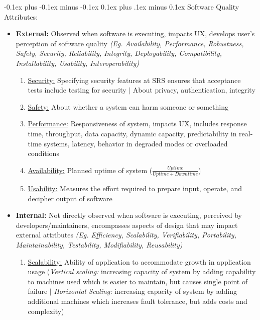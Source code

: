 \documentclass[landscape]{article}
\makeatletter
\renewcommand{\subsection}{\@startsection{subsection}{2}{0mm}%
  {-0.1ex plus -0.1ex minus -0.1ex}%
  {0.1ex plus .1ex minus 0.1ex}%
{\normalfont\scriptsize\bfseries}}
\makeatother
\begin{document}
\begin{multicols*}{5}
    \subsection{Software Quality Attributes:}
    \begin{itemize}
      \item \textbf{External:} Observed when software is executing, impacts UX, develops user's perception of software quality \textit{(Eg. Availability, Performance, Robustness, Safety, Security, Reliability, Integrity, Deployability, Compatibility, Installability, Usability, Interoperability)}
      \begin{enumerate}
        \item \underline{Security:} Specifying security features at SRS ensures that acceptance tests include testing for security $|$ About privacy, authentication, integrity
        \item \underline{Safety:} About whether a system can harm someone or something
        \item \underline{Performance:} Responsiveness of system, impacts UX, includes response time, throughput, data capacity, dynamic capacity, predictability in real-time systems, latency, behavior in degraded modes or overloaded conditions
        \item \underline{Availability:} Planned uptime of system ($\frac{Uptime}{Uptime + Downtime}$)
        \item \underline{Usability:} Measures the effort required to prepare input, operate, and decipher output of software
      \end{enumerate}
      \item \textbf{Internal:} Not directly observed when software is executing, perceived by developers/maintainers, encompasses aspects of design that may impact external attributes \textit{(Eg. Efficiency, Scalability, Verifiability, Portability, Maintainability, Testability, Modifiability, Reusability)}
      \begin{enumerate}
        \item \underline{Scalability:} Ability of application to accommodate growth in application usage (\textit{Vertical scaling:} increasing capacity of system by adding capability to machines used which is easier to maintain, but causes single point of failure $|$ \textit{Horizontal Scaling:} increasing capacity of system by adding additional machines which increases fault tolerance, but adds costs and complexity)
      \end{enumerate}
    \end{itemize}


\end{multicols*}
\end{document}
